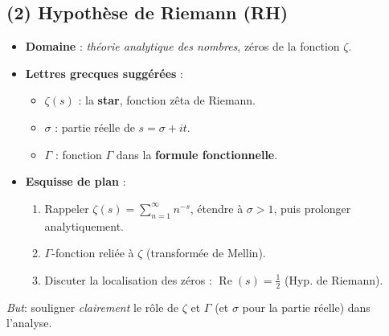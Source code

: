 \documentclass[12pt]{article}
\begin{document}
\subsection{(2) Hypothèse de Riemann (RH)}
\begin{itemize}
    \item \textbf{Domaine} : \emph{théorie analytique des nombres}, zéros de la fonction \(\zeta\).
    \item \textbf{Lettres grecques suggérées} :
    \begin{itemize}
        \item \(\zeta(s)\) : la \textbf{star}, fonction zêta de Riemann.
        \item \(\sigma\) : partie réelle de \(s=\sigma + it\).
        \item \(\Gamma\) : fonction \(\Gamma\) dans la \textbf{formule fonctionnelle}.
    \end{itemize}
    \item \textbf{Esquisse de plan} :
    \begin{enumerate}
        \item Rappeler \(\zeta(s)=\sum_{n=1}^\infty n^{-s}\), 
              étendre à \(\sigma>1\), puis prolonger analytiquement.
        \item \(\Gamma\)-fonction reliée à \(\zeta\) (transformée de Mellin).
        \item Discuter la localisation des zéros : \(\operatorname{Re}(s)=\tfrac12\) 
              (Hyp. de Riemann).
    \end{enumerate}
\end{itemize}
\emph{But}: souligner \emph{clairement} le rôle de \(\zeta\) et \(\Gamma\) 
(et \(\sigma\) pour la partie réelle) dans l’analyse.
\end{document}
